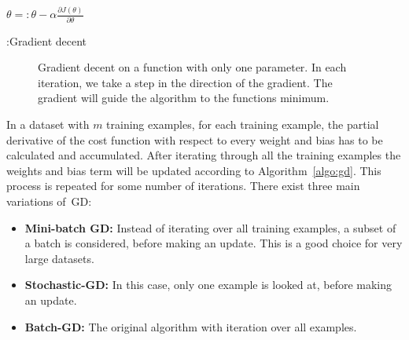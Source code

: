 \begin{algorithm}[htbp]
  \begin{algorithmic}[1]
    \newcommand{\UF}{\mathrm{U}}
 \State $\theta=: \theta- \alpha\frac { \partial J(\theta) }{ \partial \theta } $
  \EndWhile
  \end{algorithmic}
\caption{:Gradient decent }
 \label{algo:gd}
\end{algorithm}

\begin{figure}
\centering 
\resizebox{0.65\textwidth}{0.4\textwidth}{      

}
\caption{Gradient decent on a function with only one parameter.
%
In each iteration, we take a step in the direction of the gradient. The gradient will guide the algorithm to the functions minimum.
}
\label{fig:gradientD}
\end{figure}
\noindent
In a dataset with $m$ training examples, for each training example, the partial derivative of the cost function with respect to every weight and bias has to be calculated and accumulated.
%
After iterating through all the training examples the weights and bias term will be updated according to Algorithm~\ref{algo:gd}. This process is repeated  for some number of iterations. There exist three main variations of~GD: 
\begin{itemize}
\item \textbf{Mini-batch GD: } Instead of iterating over all training examples, a subset of a batch is considered, before making an update. This is a good choice for very large datasets.
\item \textbf{Stochastic-GD: } In this case, only one example is looked at, before making an update. 
\item \textbf{Batch-GD: } The original algorithm with iteration over all examples. 
\end{itemize}

